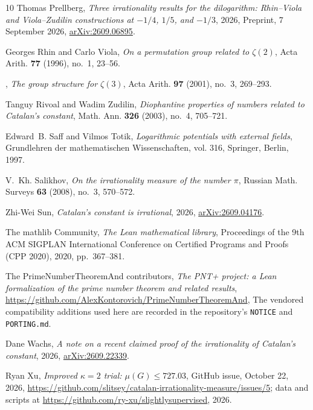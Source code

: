 \documentclass[11pt]{amsart}
\theoremstyle{definition}
\theoremstyle{remark}
\numberwithin{equation}{section}
\begin{document}
\begin{thebibliography}{10}
Thomas Prellberg, \emph{Three irrationality results for the dilogarithm:
  {R}hin--{V}iola and {V}iola--{Z}udilin constructions at {$-1/4$}, {$1/5$},
  and {$-1/3$}}, 2026, Preprint, 7 September 2026,
  \href{https://arxiv.org/abs/2609.06895}{arXiv:2609.06895}.

Georges Rhin and Carlo Viola, \emph{On a permutation group related to
  {$\zeta(2)$}}, Acta Arith. \textbf{77} (1996), no.~1, 23--56.

\bysame, \emph{The group structure for {$\zeta(3)$}}, Acta Arith. \textbf{97}
  (2001), no.~3, 269--293.

Tanguy Rivoal and Wadim Zudilin, \emph{Diophantine properties of numbers
  related to {C}atalan's constant}, Math. Ann. \textbf{326} (2003), no.~4,
  705--721.

Edward~B. Saff and Vilmos Totik, \emph{Logarithmic potentials with external
  fields}, Grundlehren der mathematischen Wissenschaften, vol. 316, Springer,
  Berlin, 1997.

V.~Kh. Salikhov, \emph{On the irrationality measure of the number {$\pi$}},
  Russian Math. Surveys \textbf{63} (2008), no.~3, 570--572.

Zhi-Wei Sun, \emph{Catalan's constant is irrational}, 2026,
  \href{https://arxiv.org/abs/2609.04176}{arXiv:2609.04176}.

{The mathlib Community}, \emph{The {L}ean mathematical library}, Proceedings of
  the 9th ACM SIGPLAN International Conference on Certified Programs and Proofs
  (CPP 2020), 2020, pp.~367--381.

{The PrimeNumberTheoremAnd contributors}, \emph{The {PNT+} project: a {L}ean
  formalization of the prime number theorem and related results},
  \url{https://github.com/AlexKontorovich/PrimeNumberTheoremAnd}, The vendored
  compatibility additions used here are recorded in the repository's
  \texttt{NOTICE} and \texttt{PORTING.md}.

Dane Wachs, \emph{A note on a recent claimed proof of the irrationality of
  {C}atalan's constant}, 2026,
  \href{https://arxiv.org/abs/2609.22339}{arXiv:2609.22339}.

Ryan Xu, \emph{Improved {$\kappa=2$} trial: {$\mu(G)\le727.03$}}, GitHub issue,
  October 22, 2026,
  \url{https://github.com/slitsey/catalan-irrationality-measure/issues/5}; data
  and scripts at \url{https://github.com/ry-xu/slightlysupervised}, 2026.


\end{thebibliography}
\end{document}
